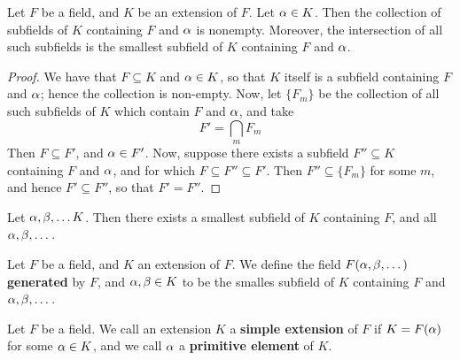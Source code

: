\begin{proposition}\label{proposition_8.1.7}
  Let $F$ be a field, and $K$ be an extension of $F$. Let  $\alpha \in K$.
  Then the collection of subfields of $K$ containing $F$ and $\alpha$ is
  nonempty. Moreover, the intersection of all such subfields is the
  smallest subfield of $K$ containing $F$ and $\alpha$.
\end{proposition}
\begin{proof}
  We have that $F \subseteq K$ and $\alpha \in K$, so that $K$ itself is a
  subfield containing $F$ and $\alpha$; hence the collection is non-empty.
  Now, let $\{F_m\}$ be the collection of all such subfields of $K$
  which contain  $F$ and  $\alpha$, and take
  \begin{equation*}
    F'=\bigcap_{m}{F_m}
  \end{equation*}
  Then $F \subseteq F'$, and $\alpha \in F'$. Now, suppose there exists a
  subfield $F'' \subseteq K$ containing $F$ and $\alpha$, and for which
  $F \subseteq F'' \subseteq F'$. Then $F'' \subseteq \{F_m\}$ for
  some $m$, and hence $F' \subseteq F''$, so that $F'=F''$.
\end{proof}
\begin{corollary}
  Let $\alpha,\beta, \dots K$. Then there exists a smallest subfield of $K$
  containing $F$, and all $\alpha,\beta, \dots$.
\end{corollary}

\begin{definition}
  Let $F$ be a field, and $K$ an extension of $F$. We define the field
  $F(\alpha,\beta, \dots)$ \textbf{generated} by $F$, and $\alpha,\beta \in K$ to be
  the smalles subfield of $K$ containing $F$ and $\alpha,\beta,\dots$.
\end{definition}

\begin{definition}
  Let $F$ be a field. We call an extension $K$ a \textbf{simple
  extension} of $F$ if  $K=F(\alpha)$ for some $\alpha \in K$, and we call
  $\alpha$ a \textbf{primitive element} of $K$.
\end{definition}

